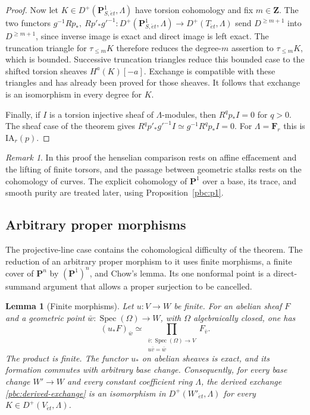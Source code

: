 \documentclass[11pt,a4paper]{article}
\numberwithin{equation}{section}
\newtheorem{lemma}[theorem]{Lemma}
\theoremstyle{definition}
\theoremstyle{remark}
\newtheorem{remark}[theorem]{Remark}
\newcommand{\D}{D}
\newcommand{\et}{\acute{e}t}
\newcommand{\Z}{\mathbf Z}
\newcommand{\PP}{\mathbf P}
\begin{document}
\begin{proof}
Now let $K\in D^+(\PP^1_{S,\et},\Lambda)$ have torsion cohomology and
fix $m\in\Z$. The two functors
$g^{-1}Rp_*,\ Rp'_*g'^{-1}\colon D^+(\PP^1_{S,\et},\Lambda)\to
D^+(T_{\et},\Lambda)$ send $D^{\geq m+1}$ into $D^{\geq m+1}$, since inverse image is exact and direct image is
left exact.  The truncation triangle for $\tau_{\leq m}K$ therefore
reduces the degree-$m$ assertion to $\tau_{\leq m}K$, which is bounded.
Successive truncation triangles reduce this bounded case to the
shifted torsion sheaves $H^a(K)[-a]$.  Exchange is compatible with
these triangles and has already been proved for those sheaves.
It follows that exchange is an isomorphism in every degree for $K$.

Finally, if $I$ is a torsion injective sheaf of $\Lambda$-modules, then
$R^qp_*I=0$ for $q>0$.  The sheaf case of the theorem gives
$R^qp'_*g'^{-1}I\simeq g^{-1}R^qp_*I=0$.  For
$\Lambda=\mathbf F_r$ this is $\mathrm{IA}_r(p)$.
\end{proof}

\begin{remark}
In this proof the henselian comparison rests on affine effacement and
the lifting of finite torsors, and the passage between geometric stalks
rests on the cohomology of curves. The explicit cohomology of $\PP^1$
over a base, its trace, and smooth purity are treated later, using
Proposition~\ref{pbc:p1}.
\end{remark}
\subsection{Arbitrary proper morphisms}
\label{pbc:sec-reduction}

The projective-line case contains the cohomological difficulty of the
theorem. The reduction of an arbitrary proper morphism to it uses finite
morphisms, a finite cover of $\mathbf P^n$ by $(\mathbf P^1)^n$, and
Chow's lemma. Its one nonformal point is a direct-summand argument that
allows a proper surjection to be cancelled.

\begin{lemma}[Finite morphisms]\label{pbc:finite}
Let $u:V\to W$ be finite. For an abelian sheaf $F$ and a geometric point
$\bar w:\operatorname{Spec}(\Omega)\to W$, with $\Omega$ algebraically
closed, one has
\[
 (u_*F)_{\bar w}
 \simeq \prod_{\substack{\bar v:\operatorname{Spec}(\Omega)\to V\\
                         u\bar v=\bar w}}F_{\bar v}.
\]
The product is finite. The functor $u_*$ on abelian sheaves is exact,
and its formation commutes with arbitrary base change. Consequently, for
every base change $W'\to W$ and every constant coefficient ring
$\Lambda$, the derived exchange
\eqref{pbc:derived-exchange} is an isomorphism in
$\D^+(W'_{\et},\Lambda)$ for every $K\in\D^+(V_{\et},\Lambda)$.
\end{lemma}
\end{document}

